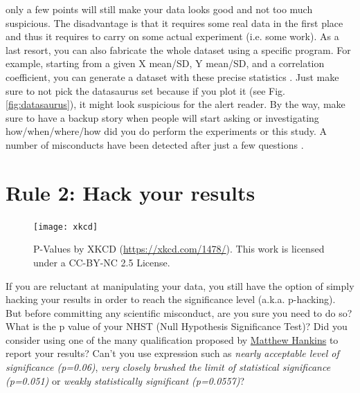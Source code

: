 \documentclass[a4paper,10pt,onecolumn]{article}
\begin{document}
only a few points will still make your data looks good and not too much
suspicious. The disadvantage is that it requires some real data in the first
place and thus it requires to carry on some actual experiment (i.e. some
work). As a last resort, you can also fabricate the whole dataset using a
specific program. For example, starting from a given X mean/SD, Y mean/SD, and
a correlation coefficient, you can generate a dataset with these precise
statistics \citep{matejka:2017}. Just make sure to not pick the datasaurus set
because if you plot it (see Fig. \ref{fig:datasaurus}), it might look
suspicious for the alert reader. By the way, make sure to have a backup story
when people will start asking or investigating how/when/where/how did you do
perform the experiments or this study. A number of misconducts have been
detected after just a few questions \citep{vastag:2006}.


\section*{Rule 2: Hack your results}

\begin{figure}
  \vspace{-5mm}
  \begin{center}
    \texttt{[image: xkcd]}
  \end{center}
  \caption{P-Values by XKCD (\url{https://xkcd.com/1478/}). This work is
    licensed under a CC-BY-NC 2.5 License.}
  \label{fig:xkcd}
\end{figure}
If you are reluctant at manipulating your data, you still have the option of
simply hacking your results in order to reach the significance level
(a.k.a. p-hacking). But before committing any scientific misconduct, are you
sure you need to do so? What is the p value of your NHST (Null Hypothesis
Significance Test)? Did you consider using one of the many qualification
proposed by
\href{https://mchankins.wordpress.com/2013/04/21/still-not-significant-2/}{Matthew
  Hankins} to report your results? Can't you use expression such as {\em nearly
acceptable level of significance (p=0.06)}, {\em very closely brushed the limit of
statistical significance (p=0.051)} or {\em weakly statistically significant
(p=0.0557)}?\\
\end{document}

